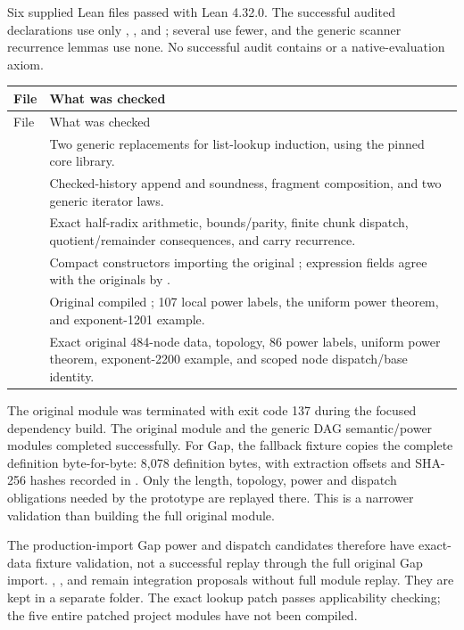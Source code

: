 Six supplied Lean files passed with Lean 4.32.0. The successful audited
declarations use only , , and
; several use fewer, and the generic scanner recurrence
lemmas use none. No successful audit contains  or a
native-evaluation axiom.

\begin{longtable}{@{}P{0.31\textwidth}P{0.59\textwidth}@{}}
\toprule
File & What was checked\\\midrule
\endfirsthead
\toprule File & What was checked\\\midrule
\endhead
{} & Two generic replacements for list-lookup induction,
using the pinned core library.\\
 & Checked-history append and soundness, fragment
composition, and two generic iterator laws.\\
 & Exact half-radix arithmetic, bounds/parity,
finite chunk dispatch, quotient/remainder consequences, and carry recurrence.\\
 & Compact constructors importing the original
; expression fields agree with the originals by
.\\
 & Original compiled ;
107 local power labels, the uniform power theorem, and exponent-1201 example.\\
 & Exact original 484-node data, topology,
86 power labels, uniform power theorem, exponent-2200 example, and scoped
node dispatch/base identity.\\
\bottomrule
\end{longtable}

The original  module was terminated with exit code 137
during the focused dependency build. The original 
module and the generic DAG semantic/power modules completed successfully.
For Gap, the fallback fixture copies the complete 
definition byte-for-byte: 8,078 definition bytes, with extraction offsets
and SHA-256 hashes recorded in .
Only the length, topology, power and dispatch obligations needed by the
prototype are replayed there. This is a narrower validation than building
the full original module.

The production-import Gap power and dispatch candidates therefore have
exact-data fixture validation, not a successful replay through the full
original Gap import. ,
, and
 remain integration proposals without
full module replay. They are kept in a separate  folder.
The exact lookup patch passes applicability checking; the five entire
patched project modules have not been compiled.

